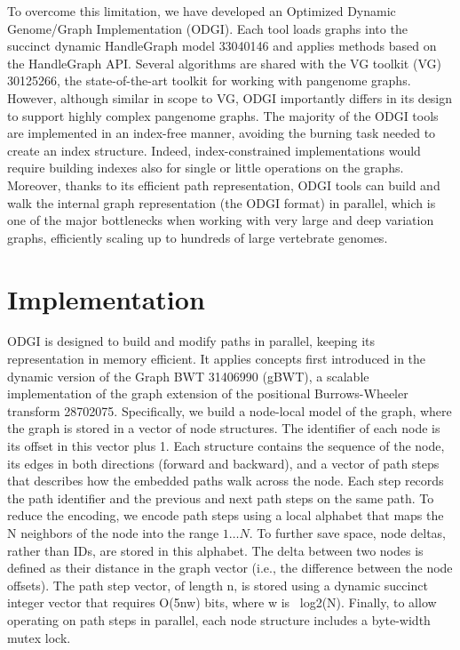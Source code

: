 \documentclass{bioinfo}
\begin{document}
To overcome this limitation, we have developed an Optimized Dynamic Genome/Graph Implementation (ODGI). Each tool loads graphs into the succinct dynamic HandleGraph model {33040146} and applies methods based on the HandleGraph API. Several algorithms are shared with the VG toolkit (VG) {30125266}, the state-of-the-art toolkit for working with pangenome graphs. However, although similar in scope to VG, ODGI importantly differs in its design to support highly complex pangenome graphs. The majority of the ODGI tools are implemented in an index-free manner, avoiding the burning task needed to create an index structure. Indeed, index-constrained implementations would require building indexes also for single or little operations on the graphs. Moreover, thanks to its efficient path representation, ODGI tools can build and walk the internal graph representation (the ODGI format) in parallel, which is one of the major bottlenecks when working with very large and deep variation graphs, efficiently scaling up to hundreds of large vertebrate genomes.

\cite{Eizenga_2020}


\section{Implementation}

ODGI is designed to build and modify paths in parallel, keeping its representation in memory efficient.
It applies concepts first introduced in the dynamic version of the Graph BWT {31406990} (gBWT), a scalable implementation of the graph extension of the positional Burrows-Wheeler transform {28702075}.
Specifically, we build a node-local model of the graph, where the graph is stored in a vector of node structures.
The identifier of each node is its offset in this vector plus 1.
Each structure contains the sequence of the node, its edges in both directions (forward and backward), and a vector of path steps that describes how the embedded paths walk across the node.
Each step records the path identifier and the previous and next path steps on the same path.
To reduce the encoding, we encode path steps using a local alphabet that maps the N neighbors of the node into the range $1\ldots N$.
To further save space, node deltas, rather than IDs, are stored in this alphabet.
The delta between two nodes is defined as their distance in the graph vector (i.e., the difference between the node offsets).
The path step vector, of length n, is stored using a dynamic succinct integer vector that requires O(5nw) bits, where w is ~log2(N).
Finally, to allow operating on path steps in parallel, each node structure includes a byte-width mutex lock.
\end{document}
